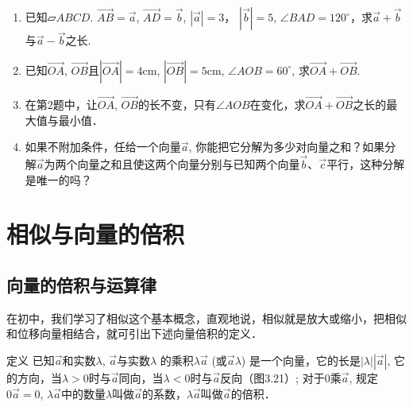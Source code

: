 \begin{enumerate}
    \item 已知$\parallelogram{ABCD}$. $\Vec{AB}=\vec{a}$, $\Vec{AD}=\vec{b}$, $|\vec{a}|=3$，
$|\vec{b}|=5$, $\angle BAD=120^{\circ}$，求$\vec{a}+\vec{b}$与$\vec{a}-\vec{b}$之长.
\item 已知$\Vec{OA}$, $\Vec{OB}$且$|\Vec{OA}|=4$cm, $|\Vec{OB}|=5$cm, $\angle AOB=60^{\circ}$, 求$\Vec{OA}+\Vec{OB}$.
\item 在第2题中，让$\Vec{OA}$, $\Vec{OB}$的长不变，只有$\angle AOB$在变化，求$\Vec{OA}+\Vec{OB}$之长的最大值与最小值．

\item 如果不附加条件，任给一个向量$\vec{a}$, 你能把它分解为多少对向量之和？如果分解$\vec{a}$为两个向量之和且使这两个向量分别与已知两个向量$\vec{b}$、$\vec{c}$平行，这种分解是唯一的吗？
\end{enumerate}

\section{相似与向量的倍积}
\subsection{向量的倍积与运算律}

在初中，我们学习了相似这个基本概念，直观地说，相似就是放大或缩小，把相似和位移向量相结合，就可引出下述向量倍积的定义．

\begin{blk}
    {定义} 已知$\vec{a}$和实数$\lambda$, $\vec{a}$与实数$\lambda$ 的乘积$\lambda \vec{a}$ (或$\vec{a}\lambda $) 是一个向量，它的长是$|\lambda| \left|\vec{a}\right|$, 它的方向，当$\lambda >0$时与$\vec{a}$同向，当$\lambda <0$时与$\vec{a}$反向（图3.21）; 对于0乘$\vec{a}$, 规定$0\vec{a}=0$, $\lambda \vec{a}$中的数量$\lambda$叫做$\vec{a}$的系数，$\lambda\vec{a}$叫做$\vec{a}$的倍积．
\end{blk}

\begin{figure}[htp]
    \centering
{}
    \caption{}
\end{figure}

